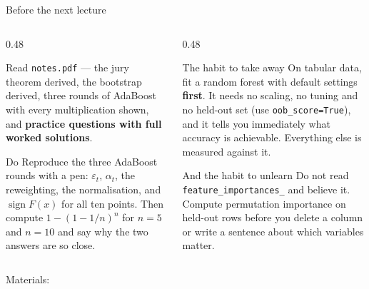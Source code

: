 \documentclass[aspectratio=169]{beamer}
\begin{document}
\begin{frame}[shrink=3]{Before the next lecture}
  \begin{columns}[T]
    \begin{column}{0.48\textwidth}
      \begin{block}{Read}
        \texttt{notes.pdf} --- the jury theorem derived, the bootstrap
        derived, three rounds of AdaBoost with every multiplication shown,
        and \textbf{practice questions with full worked solutions}.
      \end{block}
      \begin{block}{Do}
        Reproduce the three AdaBoost rounds with a pen: $\varepsilon_t$,
        $\alpha_t$, the reweighting, the normalisation, and
        $\operatorname{sign} F(x)$ for all ten points. Then compute
        $1 - (1-1/n)^n$ for $n = 5$ and $n = 10$ and say why the two answers
        are so close.
      \end{block}
    \end{column}
    \begin{column}{0.48\textwidth}
      \begin{exampleblock}{The habit to take away}
        On tabular data, fit a random forest with default settings
        \textbf{first}. It needs no scaling, no tuning and no held-out set
        (use \texttt{oob\_score=True}), and it tells you immediately what
        accuracy is achievable. Everything else is measured against it.
      \end{exampleblock}
      \begin{alertblock}{And the habit to unlearn}
        Do not read \texttt{feature\_importances\_} and believe it. Compute
        permutation importance on held-out rows before you delete a column
        or write a sentence about which variables matter.
      \end{alertblock}
    \end{column}
  \end{columns}
  \begin{center}
    \small Materials: \texttt{\AMLRepoURL}
  \end{center}
  \slidesources{\AMLUnitVISources}
\end{frame}
\end{document}
